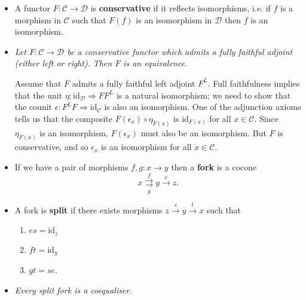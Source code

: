 \documentclass[10pt]{article}
\newcommand{\id}{\mathrm{id}}
\newcommand{\ccat}{\mathcal{C}}
\newcommand{\dcat}{\mathcal{D}}
\newcommand{\nt}{\Rightarrow}
\begin{document}
                \begin{itemize}
                    \item A functor $F\colon\ccat\to\dcat$ is \textbf{conservative} if it reflects isomorphisms, i.e. if $f$ is a morphism in $\ccat$ such that $F(f)$ is an isomorphism in $\dcat$ then $f$ is an isomorphism.
                    \item \emph{Let $F\colon\ccat\to\dcat$ be a conservative functor which admits a fully faithful adjoint (either left or right).}
                        \emph{Then $F$ is an equivalence.}

                        Assume that $F$ admits a fully faithful left adjoint $F^L$.
                        Full faithfulness implies that the unit $\eta\colon\id_\dcat\nt FF^L$ is a natural isomorphism; we need to show that the counit $\epsilon\colon F^LF\nt\id_\ccat$ is also an isomorphism.
                        One of the adjunction axioms tells us that the composite $F(\epsilon_x)\circ\eta_{F(x)}$ is $\id_{F(x)}$ for all $x\in\ccat$.
                        Since $\eta_{F(x)}$ is an isomorphism, $F(\epsilon_x)$ must also be an isomorphism.
                        But $F$ is conservative, and so $\epsilon_x$ is an isomorphism for all $x\in\ccat$.
                    \item If we have a pair of morphisms $f,g\colon x\to y$ then a \textbf{fork} is a cocone
                        \begin{equation*}
                            x\underset{g}{\overset{f}{\rightrightarrows}} y\xrightarrow{e}z.
                        \end{equation*}
                    \item A fork is \textbf{split} if there exists morphisms $z\xrightarrow{s}y\xrightarrow{t}x$ such that
                        \begin{enumerate}
                            \item $es=\id_z$
                            \item $ft=\id_y$
                            \item $gt=se$.
                        \end{enumerate}
                    \item \emph{Every split fork is a coequaliser.}


\end{itemize}
\end{document}
